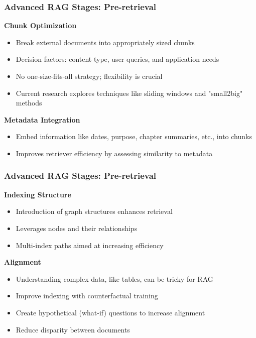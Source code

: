 \begin{frame}[fragile]\frametitle{Advanced RAG Stages: Pre-retrieval}
\textbf{Chunk Optimization}

  \begin{itemize}
    \item Break external documents into appropriately sized chunks
    \item Decision factors: content type, user queries, and application needs
    \item No one-size-fits-all strategy; flexibility is crucial
    \item Current research explores techniques like sliding windows and "small2big" methods
  \end{itemize}
  
\textbf{Metadata Integration}

  \begin{itemize}
    \item Embed information like dates, purpose, chapter summaries, etc., into chunks
    \item Improves retriever efficiency by assessing similarity to metadata
  \end{itemize}
  

\end{frame}

\begin{frame}[fragile]\frametitle{Advanced RAG Stages: Pre-retrieval}
\textbf{Indexing Structure}
  \begin{itemize}
    \item Introduction of graph structures enhances retrieval
    \item Leverages nodes and their relationships
    \item Multi-index paths aimed at increasing efficiency
  \end{itemize}
  
\textbf{Alignment}
  \begin{itemize}
    \item Understanding complex data, like tables, can be tricky for RAG
    \item Improve indexing with counterfactual training
    \item Create hypothetical (what-if) questions to increase alignment
    \item Reduce disparity between documents
  \end{itemize}
\end{frame}

